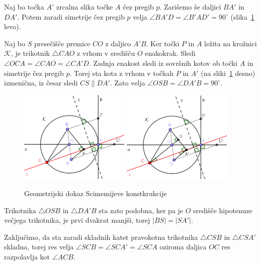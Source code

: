 
\begin{dokaz}
    Naj bo točka $A'$ zrcalna slika točke $A$ čez pregib $p$. Zarišemo še daljici $BA'$ in $DA'$. Potem zaradi simetrije čez pregib $p$ velja $\angle BA'D = \angle B'AD' = 90^\circ$ (slika~\ref{fig:scimemi_dokaz} levo).

    Naj bo $S$ presečišče premice $CO$ z daljico $A'B$. Ker točki $P$ in $A$ ležita na krožnici $\mathcal{K}$, je trikotnik $\triangle CAO$ z vrhom v središču $O$ enakokrak. Sledi $\angle OCA = \angle CAO = \angle CA'D$. Zadnja enakost sledi iz sovršnih kotov ob točki $A$ in simetrije čez pregib $p$. Torej sta kota z vrhom v točkah $P$ in $A'$ (na sliki~\ref{fig:scimemi_dokaz} desno) izmenična, iz česar sledi $CS \parallel DA'$. Zato velja $\angle OSB = \angle DA'B = 90^\circ$.

    \begin{figure}[h]
        \centering
        \includegraphics[width=0.47\textwidth]{images/alhazen/scimemi_dokaz1.png}
        \includegraphics[width=0.47\textwidth]{images/alhazen/scimemi_dokaz2.png}
        \caption[Dokaz Scimemijeve konstrukcije]{Geometrijski dokaz Scimemijeve konstkrukcije}
        \label{fig:scimemi_dokaz}
    \end{figure}

    Trikotnika $\triangle OSB$ in $\triangle DA'B$ sta zato podobna, ker pa je $O$ središče hipotenuze večjega trikotnika, je prvi dvakrat manjši, torej $|BS| = |SA'|$.

    Zaključimo, da sta zaradi skladnih katet pravokotna trikotnika $\triangle CSB$ in $\triangle CSA'$ skladna, torej res velja $\angle SCB = \angle SCA' = \angle SCA$ oziroma daljica $OC$ res razpolavlja kot $\angle ACB$.
\end{dokaz}

